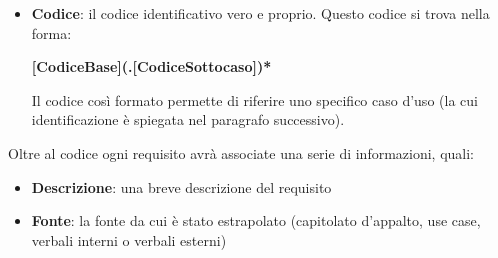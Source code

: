 \documentclass[../norme_di_progetto.tex]{subfiles}
\begin{document}
\begin{itemize}
    \item \textbf{Codice}: il codice identificativo vero e proprio. Questo codice si trova nella forma:
    \begin{center}
        \textbf{[CodiceBase](.[CodiceSottocaso])*}
    \end{center}
    Il codice così formato permette di riferire uno specifico caso d'uso (la cui identificazione è spiegata nel paragrafo successivo).
\end{itemize}

Oltre al codice ogni requisito avrà associate una serie di informazioni, quali:
\begin{itemize}
    \item \textbf{Descrizione}: una breve descrizione del requisito
    \item \textbf{Fonte}: la fonte da cui è stato estrapolato (capitolato d'appalto, use case, verbali interni o verbali esterni)
\end{itemize}
\end{document}
